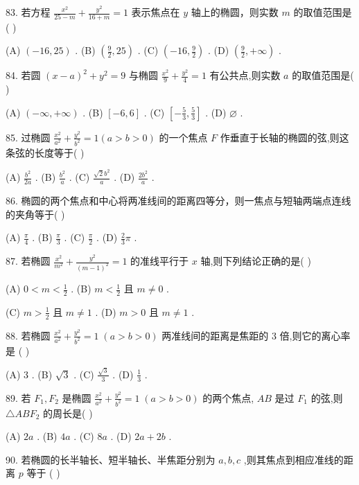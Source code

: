 \documentclass[10pt]{article}
\begin{document}
83. 若方程 \(\frac{{x}^{2}}{{25} - m} + \frac{{y}^{2}}{{16} + m} = 1\) 表示焦点在 \(y\) 轴上的椭圆，则实数 \(m\) 的取值范围是( )

(A) \(\left( {-{16},{25}}\right)\) . (B) \(\left( {\frac{9}{2},{25}}\right)\) . (C) \(\left( {-{16},\frac{9}{2}}\right)\) . (D) \(\left( {\frac{9}{2}, + \infty }\right)\) .

84. 若圆 \({\left( x - a\right) }^{2} + {y}^{2} = 9\) 与椭圆 \(\frac{{x}^{2}}{9} + \frac{{y}^{2}}{4} = 1\) 有公共点,则实数 \(a\) 的取值范围是( )

(A) \(\left( {-\infty , + \infty }\right)\) . (B) \(\left\lbrack  {-6,6}\right\rbrack\) . (C) \(\left\lbrack  {-\frac{5}{3},\frac{5}{3}}\right\rbrack\) . (D) \(\varnothing\) .

85. 过椭圆 \(\frac{{x}^{2}}{{a}^{2}} + \frac{{y}^{2}}{{b}^{2}} = 1\left( {a > b > 0}\right)\) 的一个焦点 \(F\) 作垂直于长轴的椭圆的弦,则这条弦的长度等于( )

(A) \(\frac{{b}^{2}}{2a}\) . (B) \(\frac{{b}^{2}}{a}\) . (C) \(\frac{\sqrt{2}{b}^{2}}{a}\) . (D) \(\frac{2{b}^{2}}{a}\) .

86. 椭圆的两个焦点和中心将两准线间的距离四等分，则一焦点与短轴两端点连线的夹角等于( )

(A) \(\frac{\pi }{4}\) . (B) \(\frac{\pi }{3}\) . (C) \(\frac{\pi }{2}\) . (D) \(\frac{2}{3}\pi\) .

87. 若椭圆 \(\frac{{x}^{2}}{{m}^{2}} + \frac{{y}^{2}}{{\left( m - 1\right) }^{2}} = 1\) 的准线平行于 \(x\) 轴,则下列结论正确的是( )

(A) \(0 < m < \frac{1}{2}\) . (B) \(m < \frac{1}{2}\) 且 \(m \neq  0\) .

(C) \(m > \frac{1}{2}\) 且 \(m \neq  1\) . (D) \(m > 0\) 且 \(m \neq  1\) .

88. 若椭圆 \(\frac{{x}^{2}}{{a}^{2}} + \frac{{y}^{2}}{{b}^{2}} = 1\;\left( {a > b > 0}\right)\) 两准线间的距离是焦距的 3 倍,则它的离心率是 ( )

(A) 3 . (B) \(\sqrt{3}\) . (C) \(\frac{\sqrt{3}}{3}\) . (D) \(\frac{1}{3}\) .

89. 若 \({F}_{1},{F}_{2}\) 是椭圆 \(\frac{{x}^{2}}{{a}^{2}} + \frac{{y}^{2}}{{b}^{2}} = 1\;\left( {a > b > 0}\right)\) 的两个焦点, \({AB}\) 是过 \({F}_{1}\) 的弦,则 \(\bigtriangleup {AB}{F}_{2}\) 的周长是( )

(A) \({2a}\) . (B) \({4a}\) . (C) \({8a}\) . (D) \({2a} + {2b}\) .

90. 若椭圆的长半轴长、短半轴长、半焦距分别为 \(a,b,c\) ,则其焦点到相应准线的距离 \(p\) 等于 ( )
\end{document}

